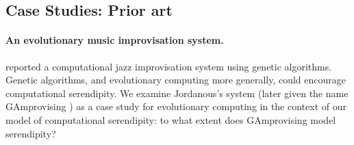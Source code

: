 

\subsection{Case Studies: Prior art}
\label{sec:priorart}

\paragraph{An evolutionary music improvisation system.}

 reported a computational jazz improvisation system using genetic algorithms. Genetic algorithms, and evolutionary computing more generally, could encourage computational serendipity. We examine Jordanous's system (later given the name {\sf GAmprovising} \cite{jordanous:12}) as a case study for evolutionary computing in the context of our model of computational serendipity: to what extent does {\sf GAmprovising} model serendipity?

